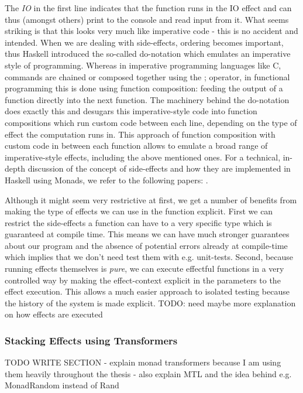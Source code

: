 The \textit{IO} in the first line indicates that the function runs in the IO effect and can thus (amongst others) print to the console and read input from it. What seems striking is that this looks very much like imperative code - this is no accident and intended. When we are dealing with side-effects, ordering becomes important, thus Haskell introduced the so-called do-notation which emulates an imperative style of programming. Whereas in imperative programming languages like C, commands are chained or composed together using the ; operator, in functional programming this is done using function composition: feeding the output of a function directly into the next function. The machinery behind the do-notation does exactly this and desugars this imperative-style code into function compositions which run custom code between each line, depending on the type of effect the computation runs in. This approach of function composition with custom code in between each function allows to emulate a broad range of imperative-style effects, including the above mentioned ones. For a technical, in-depth discussion of the concept of side-effects and how they are implemented in Haskell using Monads, we refer to the following papers: \cite{moggi_computational_1989,wadler_essence_1992,wadler_monads_1995,wadler_how_1997,jones_tackling_2002}.

Although it might seem very restrictive at first, we get a number of benefits from making the type of effects we can use in the function explicit. First we can restrict the side-effects a function can have to a very specific type which is guaranteed at compile time. This means we can have much stronger guarantees about our program and the absence of potential errors already at compile-time which implies that we don't need test them with e.g. unit-tests. Second, because running effects themselves is \textit{pure}, we can execute effectful functions in a very controlled way by making the effect-context explicit in the parameters to the effect execution. This allows a much easier approach to isolated testing because the history of the system is made explicit.  TODO: need maybe more explanation on how effects are executed

\subsubsection{Stacking Effects using Transformers}
TODO WRITE SECTION
- explain monad transformers because I am using them heavily throughout the thesis
- also explain MTL and the idea behind e.g. MonadRandom instead of Rand

